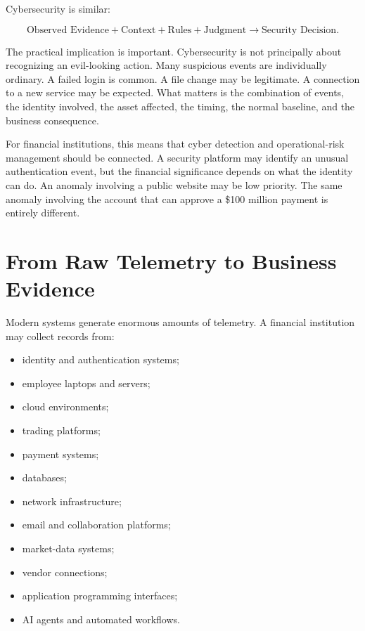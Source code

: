 Cybersecurity is similar:

\begin{equation}
\text{Observed Evidence}
+
\text{Context}
+
\text{Rules}
+
\text{Judgment}
\rightarrow
\text{Security Decision}.
\end{equation}

The practical implication is important. Cybersecurity is not principally about recognizing an evil-looking action. Many suspicious events are individually ordinary. A failed login is common. A file change may be legitimate. A connection to a new service may be expected. What matters is the combination of events, the identity involved, the asset affected, the timing, the normal baseline, and the business consequence.

For financial institutions, this means that cyber detection and operational-risk management should be connected. A security platform may identify an unusual authentication event, but the financial significance depends on what the identity can do. An anomaly involving a public website may be low priority. The same anomaly involving the account that can approve a \$100 million payment is entirely different.

\section{From Raw Telemetry to Business Evidence}

Modern systems generate enormous amounts of telemetry. A financial institution may collect records from:

\begin{itemize}
    \item identity and authentication systems;
    \item employee laptops and servers;
    \item cloud environments;
    \item trading platforms;
    \item payment systems;
    \item databases;
    \item network infrastructure;
    \item email and collaboration platforms;
    \item market-data systems;
    \item vendor connections;
    \item application programming interfaces;
    \item AI agents and automated workflows.
\end{itemize}

